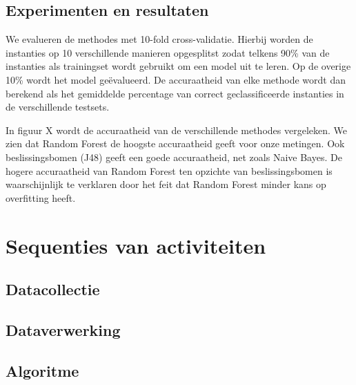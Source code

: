 \documentclass{article}
\begin{document}
\subsection{Experimenten en resultaten}

We evalueren de methodes met 10-fold cross-validatie. Hierbij worden de instanties op 10 verschillende manieren opgesplitst zodat telkens 90\% van de instanties als trainingset wordt gebruikt om een model uit te leren. Op de overige 10\% wordt het model ge\"evalueerd. De accuraatheid van elke methode wordt dan berekend als het gemiddelde percentage van correct geclassificeerde instanties in de verschillende testsets.

In figuur X %
wordt de accuraatheid van de verschillende methodes vergeleken. We zien dat Random Forest de hoogste accuraatheid geeft voor onze metingen. Ook beslissingsbomen (J48) geeft een goede accuraatheid, net zoals Naive Bayes. De hogere accuraatheid van Random Forest ten opzichte van beslissingsbomen is waarschijnlijk te verklaren door het feit dat Random Forest minder kans op overfitting heeft. %



\section{Sequenties van activiteiten}


\subsection{Datacollectie}


\subsection{Dataverwerking}


\subsection{Algoritme}

\end{document}
